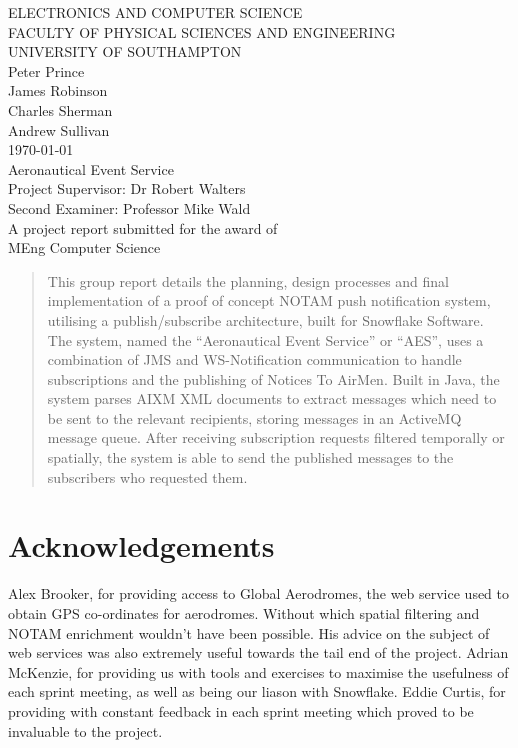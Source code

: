 \documentclass[a4paper, 12pt, twoside]{article}
\begin{document}
\begin{titlepage}

	\center

	{\large ELECTRONICS AND COMPUTER SCIENCE}\\[0.2cm]
	{\large FACULTY OF PHYSICAL SCIENCES AND ENGINEERING}\\[0.2cm]
	{\large UNIVERSITY OF SOUTHAMPTON}\\[3cm]

	{\Large Peter Prince}\\[0.2cm]
	{\Large James Robinson}\\[0.2cm]
	{\Large Charles Sherman}\\[0.2cm]
	{\Large Andrew Sullivan}\\[1cm]
	{\Large \today}\\[3cm]

	{\LARGE Aeronautical Event Service}\\[3cm]

	{\large Project Supervisor: Dr Robert Walters}\\[0.2cm]
	{\large Second Examiner: Professor Mike Wald}\\[2.5cm]

	{\large A project report submitted for the award of}\\[0.2cm]
	{\Large MEng Computer Science}

\end{titlepage}

\begin{abstract}

This group report details the planning, design processes and final implementation of a proof of concept NOTAM push notification system, utilising a publish/subscribe architecture, built for Snowflake Software. The system, named the ``Aeronautical Event Service'' or ``AES'', uses a combination of JMS and WS-Notification communication to handle subscriptions and the publishing of Notices To AirMen. Built in Java, the system parses AIXM XML documents to extract messages which need to be sent to the relevant recipients, storing messages in an ActiveMQ message queue. After receiving subscription requests filtered temporally or spatially, the system is able to send the published messages to the subscribers who requested them.

\end{abstract}

\newpage

\section*{Acknowledgements}
Alex Brooker, for providing access to Global Aerodromes, the web service used to obtain GPS co-ordinates for aerodromes. Without which spatial filtering and NOTAM enrichment wouldn't have been possible. His advice on the subject of web services was also extremely useful towards the tail end of the project.
Adrian McKenzie, for providing us with tools and exercises to maximise the usefulness of each sprint meeting, as well as being our liason with Snowflake.
Eddie Curtis, for providing with constant feedback in each sprint meeting which proved to be invaluable to the project.
\end{document}
